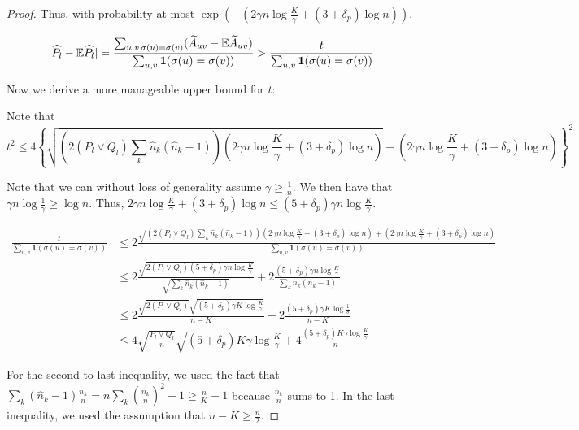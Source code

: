 \begin{proof}
Thus, with probability at most $\exp\left( -  \left( 2 \gamma n \log \frac{K}{\gamma} + (3+\delta_p) \log n \right) \right)$,

\begin{align*}
| \widehat{P}_l - {\mathbb E} \widehat{P}_l | =
\frac{\sum_{u,v \, \sigma(u) = \sigma(v)} (\widetilde{A}_{uv} - {\mathbb E} \widetilde{A}_{uv} ) }{
  \sum_{u,v} \mbox{\boldmath $1$}( \sigma(u) = \sigma(v) ) } &> 
  \frac{t}{\sum_{u,v} \mbox{\boldmath $1$}(\sigma(u) = \sigma(v)) } \\
\end{align*}

Now we derive a more manageable upper bound for $t$:

Note that 
\[
t^2 \leq 4 \left\{ \sqrt{  \left(2 (P_l \vee Q_l)  \sum_k \hat{n}_k (\hat{n}_k - 1) \right) 
               \left( 2 \gamma n \log \frac{K}{\gamma} + (3+\delta_p) \log n \right)} 
           + 
          \left(  2 \gamma n \log \frac{K}{\gamma} + (3+\delta_p) \log n \right) \right\}^2
\]

Note that we can without loss of generality assume $\gamma \geq \frac{1}{n}$. We then have that $\gamma n \log \frac{1}{\gamma} \geq \log n$. Thus, $2 \gamma n \log \frac{K}{\gamma} + (3 + \delta_p) \log n \leq (5 + \delta_p) \gamma n \log \frac{K}{\gamma}$.


\begin{align*}
 \frac{t}{\sum_{u,v} \mathbf{1}(\sigma(u) = \sigma(v)) } &\leq
  2 \frac{  \sqrt{  \left( 2 (P_l \vee Q_l) \sum_k \hat{n}_k (\hat{n}_k - 1) \right) 
                 \left( 2 \gamma n \log \frac{K}{\gamma} + (3+\delta_p) \log n \right) }  
          + 
               \left(  2 \gamma n \log \frac{K}{\gamma} + (3+\delta_p) \log n\right)  }
        { \sum_{u,v} \mathbf{1}(\sigma(u) = \sigma(v) ) }  \\
  &\leq 2 \frac{\sqrt{2 (P_l \vee Q_l) (5+\delta_p) \gamma n \log \frac{K}{\gamma}}}
             {\sqrt{ \sum_k \hat{n}_k (\hat{n}_k - 1)}} + 
        2  \frac{(5+\delta_p) \gamma n \log \frac{K}{\gamma}}
             {\sum_k \hat{n}_k (\hat{n}_k - 1)} \\
 &\leq  2 \frac{ \sqrt{2 (P_l\vee Q_l)} \sqrt{ (5+\delta_p) \gamma K \log \frac{K}{\gamma}} }
           {n - K} + 
       2 \frac{(5+\delta_p) \gamma K \log \frac{1}{\delta}}{n - K} \\
 &\leq 4 \sqrt{ \frac{P_l \vee Q_l}{n} } \sqrt{(5+\delta_p) K \gamma \log \frac{K}{\gamma}} + 
       4 \frac{(5+\delta_p) K \gamma \log \frac{K}{\gamma}}{n} 
\end{align*}

For the second to last inequality, we used the fact that $\sum_k (\hat{n}_k - 1) \frac{\hat{n}_k}{n} = n \sum_k \left( \frac{\hat{n}_k}{n} \right)^2 - 1 \geq \frac{n}{K} - 1 $ because $\frac{\hat{n}_k}{n}$ sums to 1. In the last inequality, we used the assumption that $n-K \geq \frac{n}{2}$. 


\end{proof}
